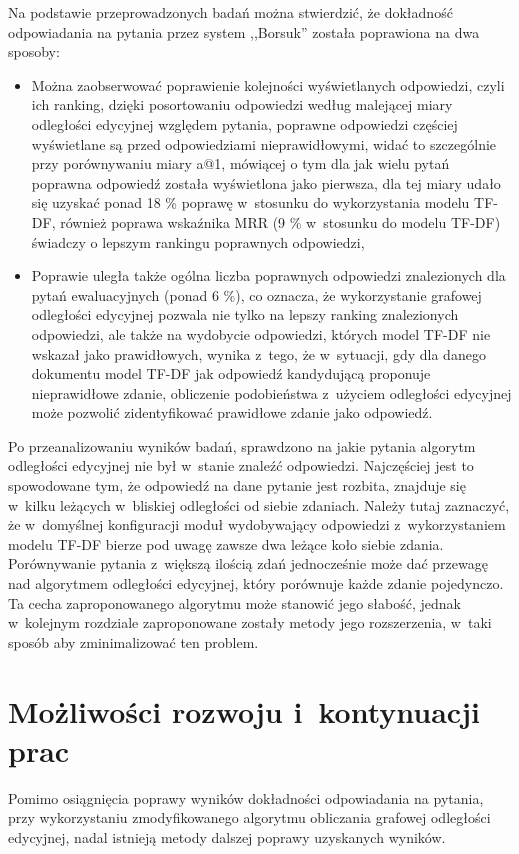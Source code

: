 \documentclass[a4paper, twoside, 12pt]{report}
\begin{document}
    Na podstawie przeprowadzonych badań można stwierdzić, że dokładność odpowiadania na pytania przez system ,,Borsuk''
    została poprawiona na dwa sposoby:
    \begin{itemize}
        \item Można zaobserwować poprawienie kolejności wyświetlanych odpowiedzi, czyli ich ranking, dzięki posortowaniu
            odpowiedzi według malejącej miary odległości edycyjnej względem pytania, poprawne odpowiedzi częściej
            wyświetlane są przed odpowiedziami nieprawidłowymi, widać to szczególnie przy porównywaniu miary a@1,
            mówiącej o tym dla jak wielu pytań poprawna odpowiedź została wyświetlona jako pierwsza, dla tej miary
            udało się uzyskać ponad 18 \% poprawę w~stosunku do wykorzystania modelu TF-DF, również poprawa wskaźnika
            MRR (9 \% w~stosunku do modelu TF-DF) świadczy o lepszym rankingu poprawnych odpowiedzi,
        \item Poprawie uległa także ogólna liczba poprawnych odpowiedzi znalezionych dla pytań ewaluacyjnych (ponad 6 \%),
            co oznacza, że wykorzystanie grafowej odległości edycyjnej pozwala nie tylko na lepszy ranking znalezionych
            odpowiedzi, ale także na wydobycie odpowiedzi, których model TF-DF nie wskazał jako prawidłowych,
            wynika z~tego, że w~sytuacji, gdy dla danego dokumentu model TF-DF jak odpowiedź kandydującą proponuje
            nieprawidłowe zdanie, obliczenie podobieństwa z~użyciem odległości edycyjnej może pozwolić zidentyfikować
            prawidłowe zdanie jako odpowiedź.
    \end{itemize}

    Po przeanalizowaniu wyników badań, sprawdzono na jakie pytania algorytm odległości edycyjnej nie był w~stanie znaleźć
    odpowiedzi. Najczęściej jest to spowodowane tym, że odpowiedź na dane pytanie jest rozbita, znajduje się w~kilku
    leżących w~bliskiej odległości od siebie zdaniach. Należy tutaj zaznaczyć, że w~domyślnej konfiguracji moduł wydobywający
    odpowiedzi z~wykorzystaniem modelu TF-DF bierze pod uwagę zawsze dwa leżące koło siebie zdania. Porównywanie pytania
    z~większą ilością zdań jednocześnie może dać przewagę nad algorytmem odległości edycyjnej, który porównuje każde
    zdanie pojedynczo. Ta cecha zaproponowanego algorytmu może stanowić jego słabość, jednak w~kolejnym rozdziale
    zaproponowane zostały metody jego rozszerzenia, w~taki sposób aby zminimalizować ten problem.

\chapter{Możliwości rozwoju i~kontynuacji prac}
    Pomimo osiągnięcia poprawy wyników dokładności odpowiadania na pytania, przy wykorzystaniu zmodyfikowanego algorytmu
    obliczania grafowej odległości edycyjnej, nadal istnieją metody dalszej poprawy uzyskanych wyników.
\end{document}
